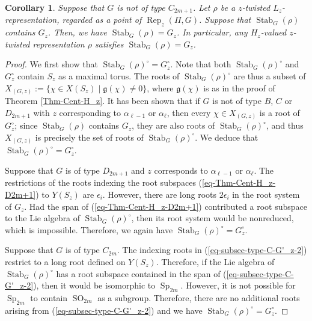 \documentclass[11pt,oneside,dvipsnames]{amsart}
\theoremstyle{plain}
\newtheorem{Cor}[Thm]{Corollary}
\theoremstyle{definition}
\theoremstyle{named}
\DeclareMathOperator{\Rep}{Rep}
\DeclareMathOperator{\SO}{SO}
\DeclareMathOperator{\Sp}{Sp}
\DeclareMathOperator{\Stab}{Stab}
\begin{document}
\begin{Cor}\label{Cor-Stab=G_z}
Suppose that $G$ is not of type $C_{2m+1}$. Let $\rho$ be a $z$-twisted $L_z$-representation, regarded as a point of $\Rep_z(\Pi,G)$. Suppose that $\Stab_G(\rho)$ contains $G_z$. Then, we have $\Stab_G(\rho)=G_z$. In particular, any $H_z$-valued $z$-twisted representation $\rho$ satisfies $\Stab_G(\rho)=G_z$.
\end{Cor}
\begin{proof}
We first show that $\Stab_G(\rho)^{\circ}=G_z^{\circ}$. Note that both $\Stab_G(\rho)^{\circ}$ and $G_z^{\circ}$ contain $S_z$ as a maximal torus. The roots of $\Stab_G(\rho)^{\circ}$ are thus a subset of $X_{(G,z)}:=\{\chi\in X(S_z)\mid\mathfrak{g}(\chi)\ne0\}$, where $\mathfrak{g}(\chi)$ is as in the proof of Theorem \ref{Thm-Cent-H_z}. It has been shown that if $G$ is not of type $B$, $C$ or $D_{2m+1}$ with $z$ corresponding to $\alpha_{\ell-1}$ or $\alpha_{\ell}$, then every $\chi\in X_{(G,z)}$ is a root of $G_z^{\circ}$; since $\Stab_G(\rho)$ contains $G_z$, they are also roots of $\Stab_G(\rho)^{\circ}$, and thus $X_{(G,z)}$ is precisely the set of roots of $\Stab_G(\rho)^{\circ}$. We deduce that $\Stab_G(\rho)^{\circ}=G_z^{\circ}$. 

Suppose that $G$ is of type $D_{2m+1}$ and $z$ corresponds to $\alpha_{\ell-1}$ or $\alpha_{\ell}$. The restrictions of the roots indexing the root subspaces (\ref{eq-Thm-Cent-H_z-D2m+1}) to $Y(S_z)$ are $\epsilon_i$. However, there are long roots $2\epsilon_i$ in the root system of $G_z$. Had the span of (\ref{eq-Thm-Cent-H_z-D2m+1}) contributed a root subspace to the Lie algebra of $\Stab_G(\rho)^{\circ}$, then its root system would be nonreduced, which is impossible. Therefore, we again have $\Stab_G(\rho)^{\circ}=G_z^{\circ}$. 

Suppose that $G$ is of type $C_{2m}$. The indexing roots in (\ref{eq-subsec-type-C-G'_z-2}) restrict to a long root defined on $Y(S_z)$. Therefore, if the Lie algebra of $\Stab_G(\rho)^{\circ}$ has a root subspace contained in the span of (\ref{eq-subsec-type-C-G'_z-2}), then it would be isomorphic to $\Sp_{2m}$. However, it is not possible for $\Sp_{2m}$ to contain $\SO_{2m}$ as a subgroup. Therefore, there are no additional roots arising from (\ref{eq-subsec-type-C-G'_z-2}) and we have $\Stab_G(\rho)^{\circ}=G_z^{\circ}$. 


\end{proof}
\end{document}
